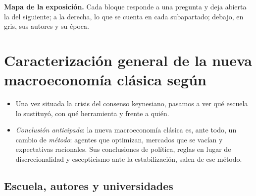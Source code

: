\documentclass[11pt]{article}
\begin{document}
\begin{anotaciones}
\textbf{Mapa de la exposición.} Cada bloque responde a una pregunta y deja abierta la del siguiente; a la derecha, lo que se cuenta en cada subapartado; debajo, en gris, sus autores y su época.
\begin{infografiacaja}
\caption{Mapa del tema: la pregunta de cada bloque, sus subapartados y el hilo que los une}\label{figu:mapa-tema}
\end{infografiacaja}
\end{anotaciones}



\section{Caracterización general de la nueva macroeconomía clásica\cortetitulo{} según }\label{sec:caracterizacion}

\begin{itemize}
\item Una vez situada la crisis del consenso keynesiano, pasamos a ver qué escuela lo sustituyó, con qué herramienta y frente a quién.
\item \emph{Conclusión anticipada}: la nueva macroeconomía clásica es, ante todo, un cambio de \emph{método}: agentes que optimizan, mercados que se vacían y expectativas racionales. Sus conclusiones de política, reglas en lugar de discrecionalidad y escepticismo ante la estabilización, salen de ese método.
\end{itemize}

\subsection{Escuela, autores y universidades}\label{sec:escuela}
\end{document}
